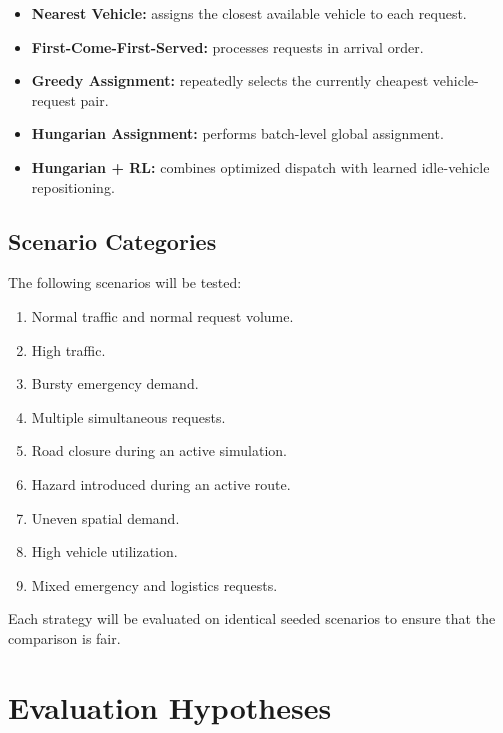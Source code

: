 \documentclass[12pt,a4paper]{article}
\begin{document}
\begin{itemize}
    \item \textbf{Nearest Vehicle:} assigns the closest available
    vehicle to each request.

    \item \textbf{First-Come-First-Served:} processes requests in
    arrival order.

    \item \textbf{Greedy Assignment:} repeatedly selects the
    currently cheapest vehicle-request pair.

    \item \textbf{Hungarian Assignment:} performs batch-level global
    assignment.

    \item \textbf{Hungarian + RL:} combines optimized dispatch with
    learned idle-vehicle repositioning.
\end{itemize}

\subsection{Scenario Categories}

The following scenarios will be tested:

\begin{enumerate}
    \item Normal traffic and normal request volume.
    \item High traffic.
    \item Bursty emergency demand.
    \item Multiple simultaneous requests.
    \item Road closure during an active simulation.
    \item Hazard introduced during an active route.
    \item Uneven spatial demand.
    \item High vehicle utilization.
    \item Mixed emergency and logistics requests.
\end{enumerate}

Each strategy will be evaluated on identical seeded scenarios to
ensure that the comparison is fair.





\section{Evaluation Hypotheses}
\end{document}
